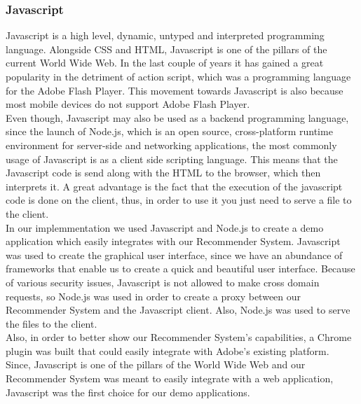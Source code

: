\subsubsection{Javascript}
\label{sec:programming-languages-javascript}
Javascript is a high level, dynamic, untyped and interpreted programming language. Alongside CSS and HTML, Javascript is one of the pillars of the current World Wide Web. In the last couple of years it has gained a great popularity in the detriment of action script, which was a programming language for the Adobe Flash Player. This movement towards Javascript is also because most mobile devices do not support Adobe Flash Player.
\\ Even though, Javascript may also be used as a backend programming language, since the launch of Node.js, which is  an open source, cross-platform runtime environment for server-side and networking applications, the most commonly usage of Javascript is as a client side scripting language. This means that the Javascript code is send along with the HTML to the browser, which then interprets it. A great advantage is the fact that the execution of the javascript code is done on the client, thus, in order to use it you just need to serve a file to the client.
\\ In our implemmentation we used Javascript and Node.js to create a demo application which easily integrates with our Recommender System. Javascript was used to create the graphical user interface, since we have an abundance of frameworks that enable us to create a quick and beautiful user interface. Because of various security issues, Javascript is not allowed to make cross domain requests, so Node.js was used in order to create a proxy between our Recommender System and the Javascript client. Also, Node.js was used to serve the files to the client.
\\ Also, in order to better show our Recommender System's capabilities, a Chrome plugin was built that could easily integrate with Adobe's existing platform.
\\ Since, Javascript is one of the pillars of the World Wide Web and our Recommender System was meant to easily integrate with a web application, Javascript was the first choice for our demo applications.


